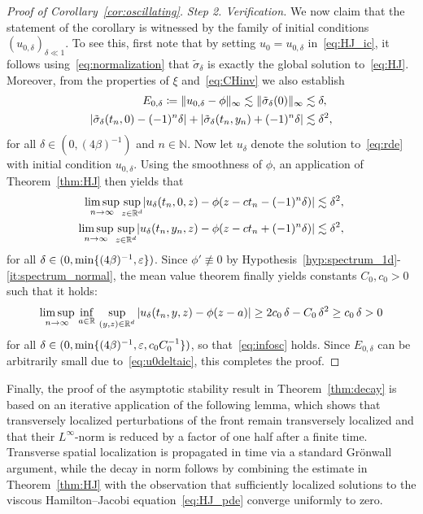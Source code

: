 \documentclass[12pt,oneside,a4paper,reqno]{amsart}
\numberwithin{equation}{section}
\theoremstyle{definition}
\theoremstyle{remark}
\newcommand{\bbN}{{\mathbb N}}
\newcommand{\bbR}{{\mathbb R}}
\newcommand{\eps}{\varepsilon}
\DeclarePairedDelimiter{\abs}{\lvert}{\rvert}
\DeclarePairedDelimiter{\norm}{\lVert}{\rVert}
\DeclarePairedDelimiter{\cur}{\{}{\}}
\begin{document}
\begin{proof}[Proof of Corollary~\ref{cor:oscillating}]
    \emph{Step 2. Verification.}
    We now claim that the statement of the corollary is witnessed by the family of initial conditions $(u_{0,\delta})_{\delta \ll 1}$.
    To see this, first note that by setting $u_0 = u_{0,\delta}$ in~\eqref{eq:HJ_ic}, it follows using~\eqref{eq:normalization} that $\tilde{\sigma}_{\delta}$ is exactly the global  solution to~\eqref{eq:HJ}.
    Moreover, from the properties of $\xi$ and~\eqref{eq:CHinv} we also establish
    \begin{subequations}
    \begin{align}
    \label{eq:u0deltaic}
    E_{0,\delta} \coloneq \norm{u_{0,\delta} - \phi}_\infty \lesssim \norm{\tilde\sigma_{\delta}(0)}_\infty &\lesssim \delta,\\
    \abs{\tilde{\sigma}_{\delta}(t_n,0) - (-1)^n \delta}+\abs{\tilde{\sigma}_{\delta}(t_n,y_n) + (-1)^n \delta} &\lesssim \delta^2,
    \end{align}
    \end{subequations}
    for all $\delta \in (0,(4\beta)^{-1})$ and $n \in \bbN$.
    Now let $u_{\delta}$ denote the solution to~\eqref{eq:rde} with initial condition $u_{0,\delta}$.
    Using the smoothness of $\phi$, an application of Theorem~\ref{thm:HJ} then yields that
    \begin{align*}
        \limsup_{n \to \infty} \sup_{z \in \bbR^d} \abs{u_{\delta}(t_n,0,z) - \phi(z - c t_n - (-1)^{n}\delta)} \lesssim \delta^2,\\
        \limsup_{n \to \infty} \sup_{z \in \bbR^d} \abs{u_{\delta}(t_n,y_n,z) - \phi(z - c t_n + (-1)^{n}\delta)} \lesssim \delta^2,
    \end{align*}
    for all $\delta \in (0,\min\cur{(4\beta)^{-1},\eps})$.
    Since $\phi' \not\equiv 0$ by Hypothesis~\ref{hyp:spectrum_1d}-\ref{it:spectrum_normal}, the mean value theorem finally yields constants $C_0,c_0 > 0$ such that it holds:
    \begin{align*}
        \limsup_{n \to \infty} \, \inf_{a \in \bbR}
        \, \sup_{(y,z) \in \bbR^d} \, \abs{u_{\delta}(t_n,y,z) - \phi(z - a)} \geq 2 c_0\, \delta - C_0\, \delta^2 \geq c_0\,\delta > 0
    \end{align*}
    for all $\delta \in (0,\min\cur{(4\beta)^{-1},\eps,c_0 C_0^{-1}})$, so that~\eqref{eq:infosc} holds.
    Since $E_{0,\delta}$ can be arbitrarily small due to~\eqref{eq:u0deltaic}, this completes the proof.
\end{proof}

Finally, the proof of the asymptotic stability result in Theorem~\ref{thm:decay} is based on an iterative application of the following lemma, which shows that transversely localized perturbations of the front remain transversely localized and that their $L^\infty$-norm is reduced by a factor of one half after a finite time. Transverse spatial localization is propagated in time via a standard Gr\"onwall argument, while the decay in norm follows by combining the estimate in Theorem~\ref{thm:HJ} with the observation that sufficiently localized solutions to the viscous Hamilton--Jacobi equation~\eqref{eq:HJ_pde} converge uniformly to zero.
\end{document}
